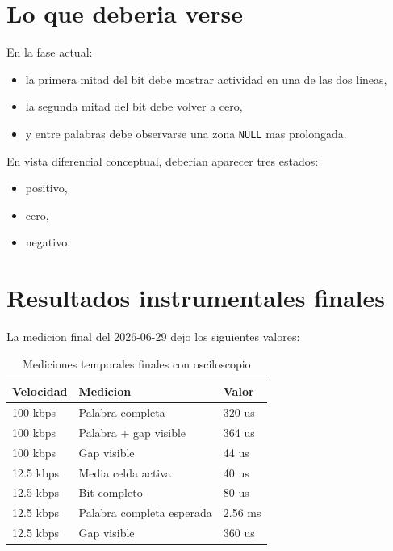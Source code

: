 \documentclass[12pt,a4paper,oneside]{report}
\begin{document}
\section{Lo que deberia verse}

En la fase actual:

\begin{itemize}[leftmargin=1.2cm]
    \item la primera mitad del bit debe mostrar actividad en una de las dos lineas,
    \item la segunda mitad del bit debe volver a cero,
    \item y entre palabras debe observarse una zona \texttt{NULL} mas prolongada.
\end{itemize}

En vista diferencial conceptual, deberian aparecer tres estados:

\begin{itemize}[leftmargin=1.2cm]
    \item positivo,
    \item cero,
    \item negativo.
\end{itemize}

\section{Resultados instrumentales finales}

La medicion final del 2026-06-29 dejo los siguientes valores:

\begin{table}[H]
\centering
\caption{Mediciones temporales finales con osciloscopio}
\begin{tabular}{lll}
\toprule
Velocidad & Medicion & Valor \\
\midrule
100 kbps & Palabra completa & 320 us \\
100 kbps & Palabra + gap visible & 364 us \\
100 kbps & Gap visible & 44 us \\
12.5 kbps & Media celda activa & 40 us \\
12.5 kbps & Bit completo & 80 us \\
12.5 kbps & Palabra completa esperada & 2.56 ms \\
12.5 kbps & Gap visible & 360 us \\
\bottomrule
\end{tabular}
\end{table}
\end{document}
